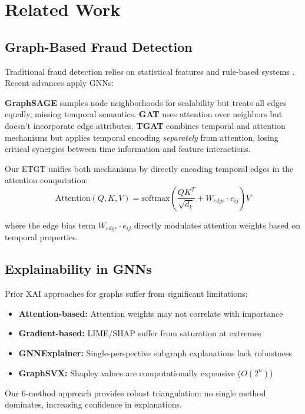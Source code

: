 \documentclass[10pt,conference,compsociety]{IEEEtran}
\begin{document}
\section{Related Work}

\subsection{Graph-Based Fraud Detection}

Traditional fraud detection relies on statistical features and rule-based systems \cite{ref3}. Recent advances apply GNNs:

\textbf{GraphSAGE} \cite{ref4} samples node neighborhoods for scalability but treats all edges equally, missing temporal semantics. \textbf{GAT} \cite{ref5} uses attention over neighbors but doesn't incorporate edge attributes. \textbf{TGAT} \cite{ref3} combines temporal and attention mechanisms but applies temporal encoding \textit{separately} from attention, losing critical synergies between time information and feature interactions.

Our ETGT unifies both mechanisms by directly encoding temporal edges in the attention computation:
\[
\text{Attention}(Q, K, V) = \text{softmax}\left(\frac{QK^T}{\sqrt{d_k}} + W_{edge} \cdot e_{ij}\right) V
\]

where the edge bias term $W_{edge} \cdot e_{ij}$ directly modulates attention weights based on temporal properties.

\subsection{Explainability in GNNs}

Prior XAI approaches for graphs suffer from significant limitations:

\begin{itemize}
    \item \textbf{Attention-based:} Attention weights may not correlate with importance \cite{ref6}
    \item \textbf{Gradient-based:} LIME/SHAP suffer from saturation at extremes \cite{ref7}
    \item \textbf{GNNExplainer:} Single-perspective subgraph explanations lack robustness
    \item \textbf{GraphSVX:} Shapley values are computationally expensive ($O(2^n)$)
\end{itemize}

Our 6-method approach provides robust triangulation: no single method dominates, increasing confidence in explanations.
\end{document}
